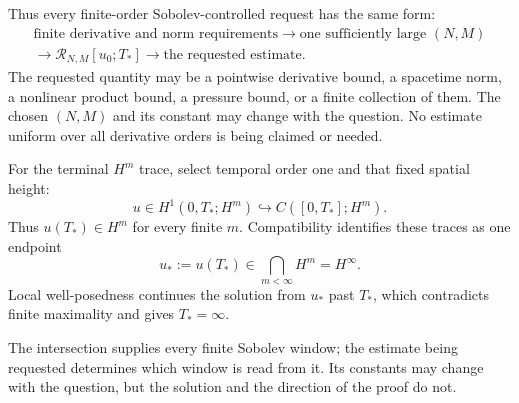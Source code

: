Thus every finite-order Sobolev-controlled request has the same form:
\[
\boxed{
\begin{gathered}
\text{finite derivative and norm requirements}
\longrightarrow
\text{one sufficiently large }(N,M)\\
\longrightarrow
\mathcal R_{N,M}[u_0;T_*]
\longrightarrow
\text{the requested estimate}.
\end{gathered}
}
\]
The requested quantity may be a pointwise derivative bound, a spacetime norm,
a nonlinear product bound, a pressure bound, or a finite collection of them.
The chosen \((N,M)\) and its constant may change with the question.  No
estimate uniform over all derivative orders is being claimed or needed.

For the terminal \(H^m\) trace, select temporal order one and that fixed
spatial height:
\[
u\in H^1(0,T_*;H^m)
\hookrightarrow C([0,T_*];H^m).
\]
Thus \(u(T_*)\in H^m\) for every finite \(m\).  Compatibility identifies
these traces as one endpoint
\[
u_*:=u(T_*)\in\bigcap_{m<\infty}H^m=H^\infty.
\]
Local well-posedness continues the solution from \(u_*\) past \(T_*\), which
contradicts finite maximality and gives \(T_*=\infty\).

The intersection supplies every finite Sobolev window; the estimate being
requested determines which window is read from it.  Its constants may change
with the question, but the solution and the direction of the proof do not.

\endgroup
